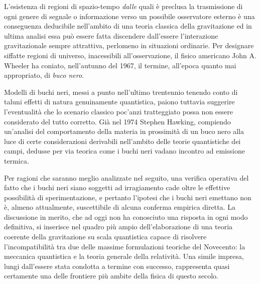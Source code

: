 
\label{app:buchi neri}
\minitoc\mtcskip
L'esistenza di regioni di spazio-tempo \emph{dalle} quali \`e preclusa la trasmissione di ogni genere di segnale o informazione verso un possibile osservatore esterno \`e una conseguenza deducibile nell'ambito di una teoria classica della gravitazione ed in ultima analisi essa pu\`o essere fatta  discendere dall'essere l'interazione gravitazionale sempre attrattiva, perlomeno in situazioni ordinarie.
Per designare siffatte regioni di universo, inacessibili all'osservazione, il fisico americano John A. Wheeler ha coniato, nell'autunno del 1967, il termine, all'epoca quanto mai appropriato, di \emph{buco nero}.
\par
Modelli di buchi neri, messi a punto nell'ultimo trentennio tenendo conto di taluni effetti di natura genuinamente quantistica, paiono tuttavia suggerire l'eventualit\`a che lo scenario classico poc'anzi tratteggiato possa non essere considerato del tutto corretto.
Gi\`{a} nel 1974 Stephen Hawking, compiendo un'analisi del comportamento della materia in prossimit\`a di un buco nero alla luce di certe considerazioni derivabili nell'ambito delle teorie quantistiche dei campi, dedusse per via teorica come i buchi neri vadano incontro ad emissione termica.
\par
Per ragioni che saranno meglio analizzate nel seguito, una verifica operativa del fatto che i buchi neri siano soggetti ad irragiamento cade oltre le effettive possibilit\`a di sperimentazione, e pertanto l'ipotesi che i buchi neri emettano non \`e, almeno attualmente, suscettibile di alcuna conferma empirica diretta.
La discussione in merito, che ad oggi non ha conosciuto una risposta in ogni
modo definitiva, si inserisce nel quadro pi\`u ampio dell'elaborazione di una
teoria coerente della gravitazione su scala quantistica capace di risolvere
l'incompatibilit\`a tra due delle massime formulazioni teoriche del Novecento: la meccanica quantistica e la teoria generale della relativit\`a.
Una simile impresa, lungi dall'essere stata condotta a termine con successo, rappresenta quasi certamente una delle frontiere pi\`u ambite della fisica di questo secolo.
